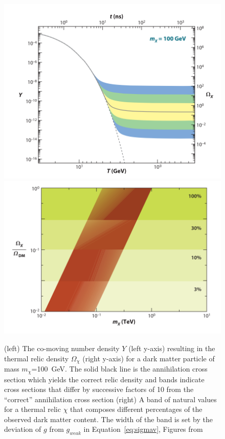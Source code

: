 \begin{figure}[htbp]
\begin{center}
\includegraphics[width=\halffig]{figures/theory/freezeout.png}
\includegraphics[width=\halffig]{figures/theory/wimp_miracle.png}
\caption{(left) The co-moving number density $Y$ (left y-axis) resulting in the thermal relic density $\Omega_{\chi}$ (right y-axis) for a dark matter particle of mass $m_{\chi}$=100~GeV. The solid black line is the annihilation cross section which yields the correct relic density and bands indicate cross sections that differ by successive factors of 10 from the ``correct'' annihilation cross section (right) A band of natural values for a thermal relic $\chi$ that composes different percentages of the observed dark matter content. The width of the band is set by the deviation of $g$ from $g_{weak}$ in Equation~\ref{eq:sigmav}, Figures from \cite{Feng2010}}
\label{fig:wimp_miracle}
\end{center}
\end{figure}

